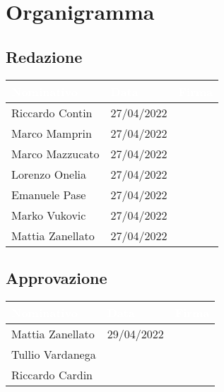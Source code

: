 \chapter{Organigramma}
\renewcommand\arraystretch{2,3}

\section{Redazione}

\begin{center}
  \centering
  \begin{longtable}{|C{3,5cm}|C{2.2cm}|C{6,5cm}|}
    \hline
    \textcolor[HTML]{FFFFFF}{\textbf{Nominativo}} & \textcolor[HTML]{FFFFFF}{\textbf{Data}} & \textcolor[HTML]{FFFFFF}{\textbf{Firma}} \\ \hline
    Riccardo Contin & 27/04/2022 &  \\ \hline
    Marco Mamprin & 27/04/2022 &  \\ \hline
    Marco Mazzucato & 27/04/2022 &  \\ \hline
    Lorenzo Onelia & 27/04/2022 &  \\ \hline
    Emanuele Pase & 27/04/2022 &  \\ \hline
    Marko Vukovic & 27/04/2022 &  \\ \hline
    Mattia Zanellato & 27/04/2022 &  \\ \hline
  \end{longtable}
\end{center}

\section{Approvazione}

\begin{center}
  \centering
  \begin{longtable}{|C{3,5cm}|C{2.2cm}|C{6,5cm}|}
    \hline
    \textcolor[HTML]{FFFFFF}{\textbf{Nominativo}} & \textcolor[HTML]{FFFFFF}{\textbf{Data}} & \textcolor[HTML]{FFFFFF}{\textbf{Firma}} \\ \hline
    Mattia Zanellato & 29/04/2022 &  \\ \hline
    Tullio Vardanega &  &  \\ \hline
    Riccardo Cardin &  &  \\ \hline
  \end{longtable}
\end{center}

